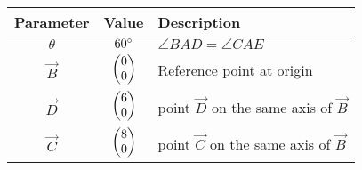 \begin{tabular}{|c|c|p{5cm}|}
\hline
\textbf{Parameter} & \textbf{Value} & \textbf{Description} \\
\hline
	$\theta$ & $60\degree$ & $\angle{BAD} = \angle{CAE}$ \\
\hline
	$\vec{B}$ & $\begin{pmatrix}0\\0\end{pmatrix}$ & Reference point at origin \\
\hline
	$\vec{D}$ & $\begin{pmatrix}6\\0\end{pmatrix}$ & point $\vec{D}$ on the same axis of $\vec{B}$ \\
\hline
	$\vec{C}$ & $\begin{pmatrix}8\\0\end{pmatrix}$ & point $\vec{C}$ on the same axis of $\vec{B}$ \\
\hline

\end{tabular}
